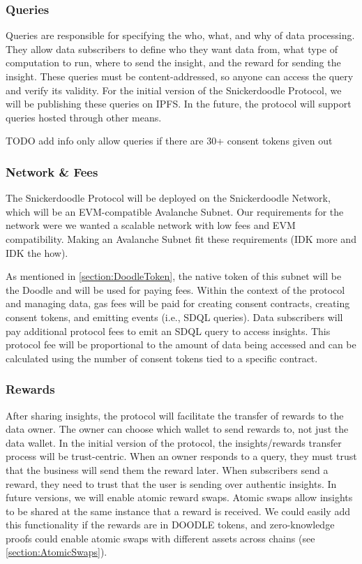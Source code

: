 \subsubsection{Queries}

Queries are responsible for specifying the who, what, and why of data processing. They allow data subscribers to define who they want data from, what type 
of computation to run, where to send the insight, and the reward for sending the insight. These queries must be content-addressed, so anyone can access the 
query and verify its validity. For the initial version of the Snickerdoodle Protocol, we will be publishing these queries on IPFS. In the future, the protocol 
will support queries hosted through other means.

TODO add info only allow queries if there are 30+ consent tokens given out

\subsubsection{Network \& Fees}

The Snickerdoodle Protocol will be deployed on the Snickerdoodle Network, which will be an EVM-compatible Avalanche Subnet. Our requirements for the 
network were we wanted a scalable network with low fees and EVM compatibility. Making an Avalanche Subnet fit these requirements (IDK more and IDK the how).

As mentioned in \ref{section:DoodleToken}, the native token of this subnet will be the Doodle and will be used for paying fees. Within the context 
of the protocol and managing data, gas fees will be paid for creating consent contracts, creating consent tokens, and emitting events (i.e., SDQL queries). 
Data subscribers will pay additional protocol fees to emit an SDQL query to access insights. This protocol fee will be proportional to the amount of data 
being accessed and can be calculated using the number of consent tokens tied to a specific contract.

\subsubsection{Rewards}

After sharing insights, the protocol will facilitate the transfer of rewards to the data owner. The owner can choose which wallet to send rewards to, not 
just the data wallet. In the initial version of the protocol, the insights/rewards transfer process will be trust-centric. When an owner responds to a 
query, they must trust that the business will send them the reward later. When subscribers send a reward, they need to trust that the user is sending 
over authentic insights. In future versions, we will enable atomic reward swaps. Atomic swaps allow insights to be shared at the same instance that a 
reward is received. We could easily add this functionality if the rewards are in DOODLE tokens, and zero-knowledge proofs could enable atomic swaps 
with different assets across chains (see \ref{section:AtomicSwaps}).

